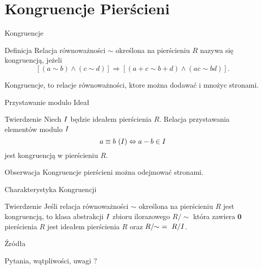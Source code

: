 \documentclass{beamer}
\newcommand{\zero}{\mathbf{0}}
\newcommand{\II}{\mathnormal{I}}
\begin{document}
\section{Kongruencje Pierścieni}
\begin{frame}{Kongruencje}
    \begin{block}{Definicja}
        Relacja równoważności $\sim$ określona na pierścieniu $R$ nazywa się \alert{kongruencją}, jeżeli 
        $$[(a \sim b) \land (c \sim d)] \Rightarrow [(a+c \sim b+d) \land (ac \sim bd)].$$
    \end{block}
    Kongruencje, to relacje równoważności, ktore można dodawać i mnożyc stronami.
\end{frame}

\begin{frame}{Przystawanie modulo Ideał}
    \begin{block}{Twierdzenie}
        Niech $\II$ będzie ideałem pierścienia $R$. Relacja przystawania elementów modulo $\II$
        $$ a \equiv b \ (\II) \Leftrightarrow a - b \in \II$$ 
        jest kongruencją w pierścieniu $R$. 
    \end{block}
    \pause
    \begin{alertblock}{Obserwacja}
        Kongruencje pierścieni można odejmować stronami. 
    \end{alertblock}
\end{frame}

\begin{frame}{Charakterystyka Kongruencji}
    \begin{block}{Twierdzenie}
        Jeśli relacja równoważności $\sim$ określona na pierścieniu $R$ jest kongruencją, to klasa abstrakcji $\II$ zbioru ilorazowego $R/\sim$ która zawiera $\zero$ pierścienia $R$ jest ideałem pierścienia $R$ oraz $R/\! \! \sim  \ = \  R/\II$.
    \end{block}
\end{frame}

\begin{frame}{Źródła}
    \printbibliography
\end{frame}

\begin{frame}
    \centering 
    \LARGE Pytania, wątpliwości, uwagi ? 
\end{frame}
\end{document}
